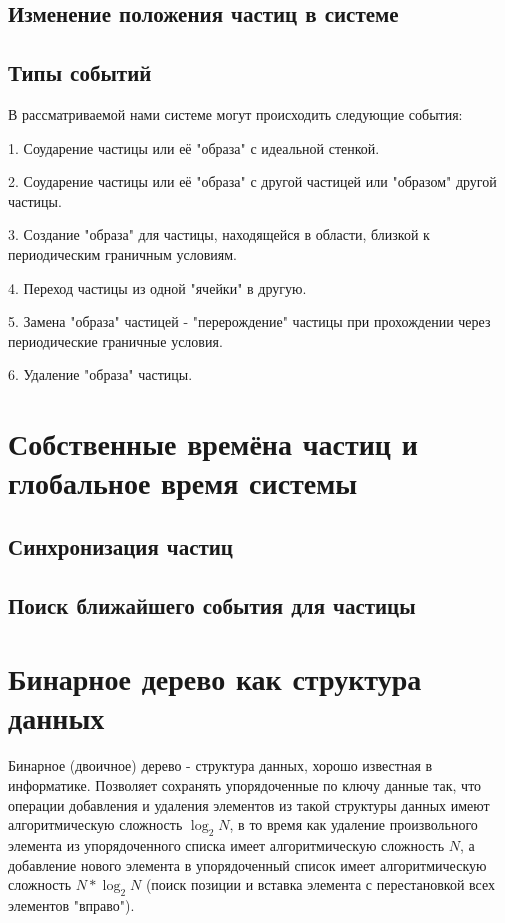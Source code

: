 \documentclass{article}
\begin{document}
\subsection{Изменение положения частиц в системе}

\subsection{Типы событий}

В рассматриваемой нами системе могут происходить следующие события:

1. Соударение частицы или её "образа" с идеальной стенкой.

2. Соударение частицы или её "образа" с другой частицей или "образом" другой частицы.

3. Создание "образа" для частицы, находящейся в области, близкой к периодическим граничным условиям.

4. Переход частицы из одной "ячейки" в другую.

5. Замена "образа" частицей - "перерождение" частицы при прохождении через периодические граничные условия.

6. Удаление "образа" частицы.

\newpage
\section{Собственные времёна частиц и глобальное время системы}

\subsection{Синхронизация частиц}

\subsection{Поиск ближайшего события для частицы}

\newpage
\section{Бинарное дерево как структура данных}
Бинарное (двоичное) дерево - структура данных, хорошо известная в информатике. Позволяет сохранять упорядоченные по ключу данные так, что операции добавления и удаления элементов из такой структуры данных  имеют алгоритмическую сложность $ \log_2{N} $, в то время как удаление произвольного элемента из упорядоченного списка имеет алгоритмическую сложность $ N $, а добавление нового элемента в упорядоченный список имеет алгоритмическую сложность $ N*\log_2{N} $ (поиск позиции и вставка элемента с перестановкой всех элементов "вправо").
\end{document}
